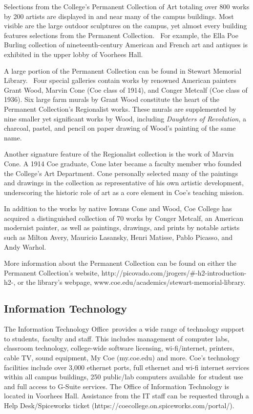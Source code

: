 \documentclass[
  letterpaper,
]{scrbook}
\begin{document}
Selections from the College's Permanent Collection of Art totaling over
800 works by 200 artists are displayed in and near many of the campus
buildings. Most visible are the large outdoor sculptures on the campus,
yet almost every building features selections from the Permanent
Collection.~ For example, the Ella Poe Burling collection of
nineteenth-century American and French art and antiques is exhibited in
the upper lobby of Voorhees Hall.

A large portion of the Permanent Collection can be found in Stewart
Memorial Library.~ Four special galleries contain works by renowned
American painters Grant Wood, Marvin Cone (Coe class of 1914), and
Conger Metcalf (Coe class of 1936). Six large farm murals by Grant Wood
constitute the heart of the Permanent Collection's Regionalist works.
These murals are supplemented by nine smaller yet significant works by
Wood, including \emph{Daughters of Revolution}, a charcoal, pastel, and
pencil on paper drawing of Wood's painting of the same name.

Another signature feature of the Regionalist collection is the work of
Marvin Cone. A 1914 Coe graduate, Cone later became a faculty member who
founded the College's Art Department. Cone personally selected many of
the paintings and drawings in the collection as representative of his
own artistic development, underscoring the historic role of art as a
core element in Coe's teaching mission.

In addition to the works by native Iowans Cone and Wood, Coe College has
acquired a distinguished collection of 70 works by Conger Metcalf, an
American modernist painter, as well as paintings, drawings, and prints
by notable artists such as Milton Avery, Mauricio Lasansky, Henri
Matisse, Pablo Picasso, and Andy Warhol.

More information about the Permanent Collection can be found on either
the Permanent Collection's website,
http://picovado.com/jrogers/\#-h2-introduction-h2-, or the library's
webpage, www.coe.edu/academics/stewart-memorial-library.

\subsection{Information Technology}\label{information-technology}

The Information Technology Office~provides a wide range of technology
support to students,~faculty and staff. This includes management of
computer labs, classroom technology, college-wide software licensing,
wi-fi/internet, printers, cable TV, sound equipment, My Coe (my.coe.edu)
and more. Coe's technology facilities include over 3,000 ethernet ports,
full ethernet and wi-fi internet services within all campus buildings,
250 public/lab computers available~for student use and full access to
G-Suite services. The Office of Information Technology is located in
Voorhees Hall. Assistance from the IT staff can be requested through a
Help Desk/Spiceworks ticket
(https://coecollege.on.spiceworks.com/portal/).~
\end{document}
